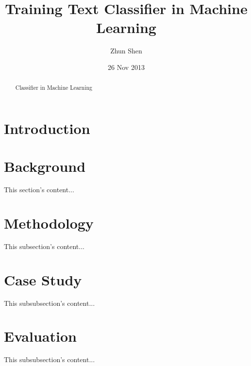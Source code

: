 \documentclass[11pt,a4paper]{article}
\begin{document}
\title{Training Text Classifier in Machine Learning}
\author{Zhun Shen}
\date{26 Nov 2013}

\maketitle
\begin{abstract}
Classifier in Machine Learning
\end{abstract}

\section{Introduction}


\section{Background}
This section's content...

\section{Methodology}
This subsection's content...

\section{Case Study}
This subsubsection's content...

\section{Evaluation}
This subsubsection's content...
\end{document}
